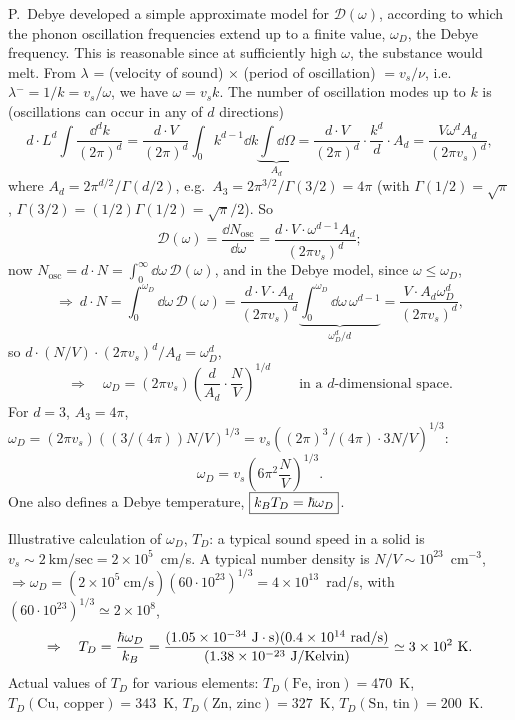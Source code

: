 P.~Debye developed a simple approximate model for $\mathcal D(\omega)$, according to which the phonon oscillation frequencies extend up
to a finite value, $\omega_D$, the Debye frequency. This is reasonable since at sufficiently high $\omega$, the substance would melt.
From $\lambda$ = (velocity of sound) $\times$ (period of oscillation) $= v_s/\nu$, i.e.\
$\lambda\!\!\!^- = 1/k = v_s/\omega$, we have $\omega = v_sk$. The number of oscillation modes up to $k$ is (oscillations can
occur in any of $d$ directions)
\begin{equation}
  d\cdot L^d\int\frac{\dd^dk}{(2\pi)^d} = \frac{d\cdot V}{(2\pi)^d}\int_0k^{d-1}\dd k\underbrace{\int\dd\Omega}_{A_d}
  = \frac{d\cdot V}{(2\pi)^d}\cdot\frac{k^d}{d}\cdot A_d = \frac{V\omega^dA_d}{(2\pi v_s)^d},
\end{equation}
where $A_d = 2\pi^{d/2}/\Gamma(d/2)$, e.g.\ $A_3 = 2\pi^{3/2}/\Gamma(3/2) = 4\pi$ (with $\Gamma(1/2) = \sqrt\pi$,
$\Gamma(3/2) = (1/2)\Gamma(1/2) = \sqrt\pi/2$). So
\begin{equation}
  \mathcal D(\omega) = \frac{\dd N_{\text{osc}}}{\dd\omega} = \frac{d\cdot V\cdot\omega^{d-1}A_d}{(2\pi v_s)^d};
\end{equation}
now $N_{\text{osc}} = d\cdot N = \int_0^\infty\dd\omega\,\mathcal D(\omega)$, and in the Debye model, since $\omega\le\omega_D$,
\begin{equation}
  \Rightarrow\ d\cdot N = \int_0^{\omega_D}\dd\omega\,\mathcal D(\omega) = \frac{d\cdot V\cdot A_d}{(2\pi v_s)^d}\underbrace{\int_0^{\omega_D}\dd\omega\,\omega^{d-1}}_{\omega_D^d/d}
  = \frac{V\cdot A_d\omega_D^d}{(2\pi v_s)^d},
\end{equation}
so $d\cdot\left(N/V\right)\cdot(2\pi v_s)^d/A_d = \omega_D^d$,
\begin{equation}
  \Rightarrow\quad\omega_D = (2\pi v_s)\left(\frac{d}{A_d}\cdot\frac{N}{V}\right)^{1/d}\qquad\text{in a $d$-dimensional space}.
\end{equation}
For $d = 3$, $A_3 = 4\pi$,
$\omega_D = (2\pi v_s)\left((3/(4\pi))N/V\right)^{1/3} = v_s\left((2\pi)^3/(4\pi)\cdot 3N/V\right)^{1/3}$:
\begin{equation}
  \boxed{\omega_D = v_s\left(6\pi^2\frac{N}{V}\right)^{1/3}}.
\end{equation}
One also defines a Debye temperature, $\boxed{k_{B} T_D = \hbar\omega_D}$.

Illustrative calculation of $\omega_D$, $T_D$: a typical sound speed in a solid is $v_s\sim 2\ \text{km/sec} = 2\times 10^5$~cm/s. A
typical number density is $N/V\sim 10^{23}$~cm$^{-3}$,
$\Rightarrow\omega_D = \left(2\times 10^5\ \text{cm}/\text{s}\right)(60\cdot 10^{23})^{1/3} = 4\times 10^{13}$~rad/s, with
$(60\cdot 10^{23})^{1/3}\simeq 2\times 10^8$,
\begin{equation}
  \Rightarrow\quad T_D = \frac{\hbar\omega_D}{\kB} = \frac{(1.05\times 10^{-34}\ \text{J}\cdot\text{s})(0.4\times 10^{14}\ \text{rad/s})}{(1.38\times 10^{-23}\ \text{J/Kelvin})}
  \simeq 3\times 10^2\ \text{K}.
\end{equation}
Actual values of $T_D$ for various elements: $T_D(\text{Fe, iron}) = 470$~K, $T_D(\text{Cu, copper}) = 343$~K,
$T_D(\text{Zn, zinc}) = 327$~K, $T_D(\text{Sn, tin}) = 200$~K.

